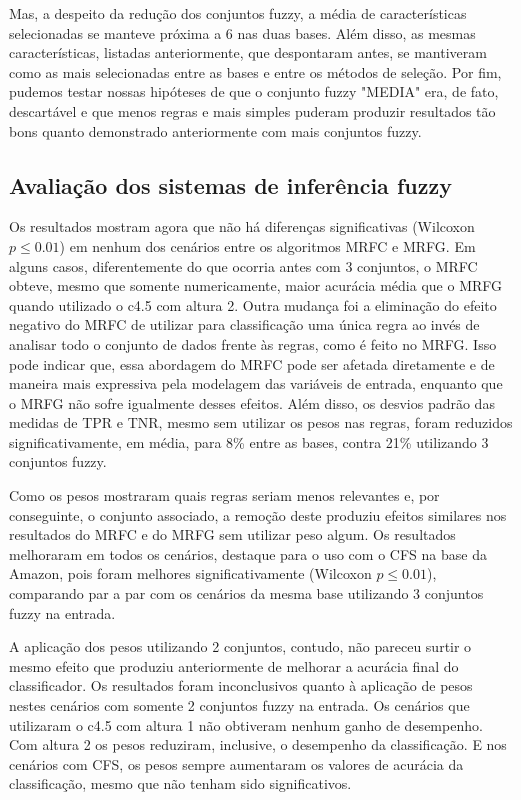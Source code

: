 \documentclass[template.tex]{subfiles}
\begin{document}
Mas, a despeito da redução dos conjuntos fuzzy, a média de características selecionadas se manteve próxima a 6 nas duas bases. Além disso, as mesmas características, listadas anteriormente, que despontaram antes, se mantiveram como as mais selecionadas entre as bases e entre os métodos de seleção. Por fim, pudemos testar nossas hipóteses de que o conjunto fuzzy "MEDIA" era, de fato, descartável e que menos regras e mais simples puderam produzir resultados tão bons quanto demonstrado anteriormente com mais conjuntos fuzzy.

\subsection{Avaliação dos sistemas de inferência fuzzy}

Os resultados mostram agora que não há diferenças significativas (Wilcoxon $p\leq0.01$) em nenhum dos cenários entre os algoritmos  MRFC e MRFG. Em alguns casos, diferentemente do que ocorria antes com 3 conjuntos, o MRFC obteve, mesmo que somente numericamente, maior acurácia média que o MRFG quando utilizado o c4.5 com altura 2. Outra mudança foi a eliminação do efeito negativo do MRFC de utilizar para classificação uma única regra ao invés de analisar todo o conjunto de dados frente às regras, como é feito no MRFG. Isso pode indicar que, essa abordagem do MRFC pode ser afetada diretamente e de maneira mais expressiva pela modelagem das variáveis de entrada, enquanto que o MRFG não sofre igualmente desses efeitos. Além disso, os desvios padrão das medidas de TPR e TNR, mesmo sem utilizar os pesos nas regras, foram reduzidos significativamente, em média, para 8\% entre as bases, contra 21\% utilizando 3 conjuntos fuzzy. 

Como os pesos mostraram quais regras seriam menos relevantes e, por conseguinte, o conjunto associado, a remoção deste produziu efeitos similares nos resultados do MRFC e do MRFG sem utilizar peso algum. Os resultados melhoraram em todos os cenários, destaque para o uso com o CFS na base da Amazon, pois foram melhores significativamente (Wilcoxon $p\leq0.01$), comparando par a par com os cenários da mesma base utilizando 3 conjuntos fuzzy na entrada. 


A aplicação dos pesos utilizando 2 conjuntos, contudo, não pareceu surtir o mesmo efeito que produziu anteriormente de melhorar a acurácia final do classificador. Os resultados foram inconclusivos quanto à aplicação de pesos nestes cenários com somente 2 conjuntos fuzzy na entrada. Os cenários que utilizaram o c4.5 com altura 1 não obtiveram nenhum ganho de desempenho. Com altura 2 os pesos reduziram, inclusive, o desempenho da classificação. E nos cenários com CFS, os pesos sempre aumentaram os valores de acurácia da classificação, mesmo que não tenham sido significativos. 
\end{document}
